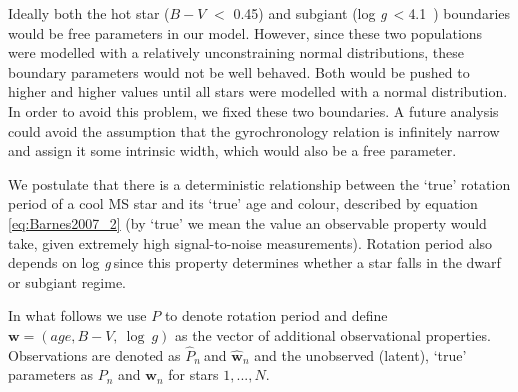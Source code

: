 \documentclass[11pt,preprint]{aastex}
\newcommand{\logg}{log \emph{g}}
\newcommand{\ph}{$\hat{P}_n$}
\newcommand{\ncooldwarfs}{45~}
\newcommand{\subcut}{4.1~}
\begin{document}
Ideally both the hot star ($B-V$ $<$ 0.45) and subgiant (\logg$~<$\subcut)
boundaries would be free parameters in our model.
However, since these two populations were modelled with a relatively
unconstraining normal distributions, these boundary parameters would not be
well behaved.
Both would be pushed to higher and higher values until all stars were modelled
with a normal distribution.
In order to avoid this problem, we fixed these two boundaries.
A future analysis could avoid the assumption that the gyrochronology relation
is infinitely narrow and assign it some intrinsic width, which would also be
a free parameter.

We postulate that there is a deterministic relationship between the `true'
rotation period of a cool MS star and its `true' age and colour, described by
equation \ref{eq:Barnes2007_2} (by `true' we mean the value an observable
property would take, given extremely high signal-to-noise measurements).
Rotation period also depends on \logg$~$since this property determines whether
a star falls in the dwarf or subgiant regime.

In what follows we use $P$ to denote rotation period and define
$\mathbf{w} = (age, B-V,~\log~g)$ as the vector of additional observational
properties.
Observations are denoted as \ph$~$and $\hat{\mathbf{w}}_n$ and the unobserved
(latent), `true' parameters as $P_n$ and $\mathbf{w}_n$ for stars $1,...,N$.
\end{document}
